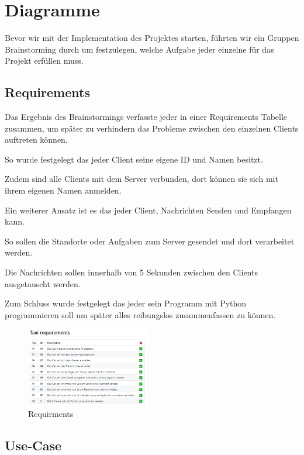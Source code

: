 \section{Diagramme}


Bevor wir mit der Implementation des Projektes starten, 
führten wir ein Gruppen Brainstorming durch um festzulegen, 
welche Aufgabe jeder einzelne für das Projekt erfüllen muss. 



\subsection{Requirements}

Das Ergebnis des Brainstormings verfasste jeder in einer Requirements Tabelle zusammen, um später zu verhindern das Probleme zwischen den einzelnen Clients auftreten können.


So wurde festgelegt das jeder Client seine eigene ID und Namen besitzt. 


Zudem sind alle Clients mit dem Server verbunden, dort können sie sich mit ihrem eigenen Namen anmelden.


Ein weiterer Ansatz ist es das jeder Client, Nachrichten Senden und Empfangen kann. 


So sollen die Standorte oder Aufgaben zum Server gesendet und dort verarbeitet werden.


Die Nachrichten sollen innerhalb von 5 Sekunden zwischen den Clients ausgetauscht werden.


Zum Schluss wurde festgelegt das jeder sein Programm mit Python programmieren soll um später alles reibungslos zusammenfassen zu können.


\begin{figure}[htbp] 
  \centering
     \includegraphics[width=0.48\textwidth]{Bsp_requirments.png}
     \caption{Requirments}
\end{figure}




\subsection{Use-Case}

